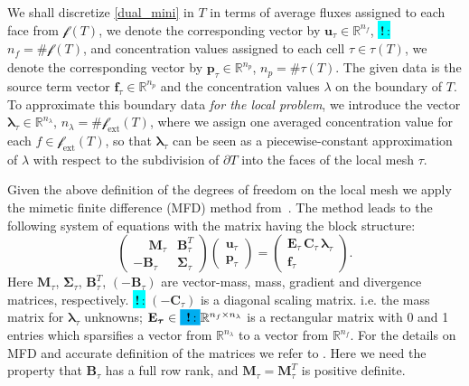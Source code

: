 \documentclass[12pt]{article}
\newcommand{\vect}[1]{\boldsymbol{\mathbf{#1}}}
\newcommand{\bmesh}{{\vect{\mathcal T}}}
\newcommand{\mmesh}{{\vect{\mathcal \tau}}}
\newcommand{\mfaces}[1][]{{\vect{\mathcal f}_{\text{#1}}}}
\newcommand{\toDiscuss}[1]{\colorbox{Cyan}{\textbf{\,!\,}:} #1}
\begin{document}
We shall discretize \eqref{dual_mini} in $T$ in terms of average fluxes assigned to each face from $\mfaces(T)$,
we denote the corresponding vector by ${\vect u}_\mmesh\in\mathbb{R}^{n_f}$, \toDiscuss{$n_f=\#\mfaces(T)$},  and concentration values assigned to each cell ${\tau \in \mmesh(T)}$, we denote the corresponding vector by ${\vect p}_\mmesh\in\mathbb{R}^{n_p}$, $n_p=\#\mmesh(T)$. The given data is the source term vector ${\vect f}_\mmesh\in \mathbb{R}^{n_p}$ and the concentration values $\lambda$ on the boundary of $T$.
To approximate this boundary data \emph{for the local problem}, we introduce the vector
${\vect \lambda}_\mmesh\in\mathbb{R}^{n_\lambda}$, $n_\lambda=\#\mfaces[ext](T)$,
where we assign one averaged concentration value for each $f\in\mfaces[ext](T)$, so that ${\vect \lambda}_\mmesh$ can be seen as a piecewise-constant approximation of $\lambda$ with respect to the subdivision of $\partial T$ into the faces of the local mesh $\mmesh$.

	
Given the above definition of the degrees of freedom on the local mesh we apply the mimetic finite difference (MFD) method from~\cite{lipnikov2014mimetic}. The method leads to the following system of equations with the matrix having the block structure:
	\begin{equation}\label{local}
		\begin{pmatrix}
			\phantom{-}\vect M_\mmesh & \vect B^T_\mmesh \\
			-\vect B_\mmesh & \vect \Sigma_\mmesh
		\end{pmatrix}
		\begin{pmatrix}
			{\vect u}_\mmesh \\
			{\vect p}_\mmesh
		\end{pmatrix}
		=
		\begin{pmatrix}
			\vect E_\mmesh\,\vect C_\mmesh\,{\vect \lambda}_\mmesh \\
			{\vect f}_\mmesh
		\end{pmatrix}.
	\end{equation}
Here $\vect M_\mmesh$, $\vect\Sigma_\mmesh$, $\vect B^T_\mmesh$, $(-\vect B_\mmesh)$ are vector-mass, mass, gradient and divergence matrices, respectively.
\toDiscuss{$(-\vect C_\mmesh)$} is a diagonal scaling matrix. i.e. the mass matrix for ${\vect \lambda}_\mmesh$ unknowns;
$\vect E_\mmesh \in \toDiscuss{\mathbb{R}^{n_f \times n_\lambda}}$ is a rectangular matrix with 0 and 1 entries which sparsifies a vector from  $\mathbb{R}^{n_{\lambda}}$
to a vector from  $\mathbb{R}^{n_{f}}$.
For the details on MFD and accurate definition of the matrices we refer to \cite{lipnikov2014mimetic,MFDbook}.
Here we need the property that  $\vect B_\mmesh$ has a full row rank, and $\vect M_\mmesh = \vect M^T_\mmesh$ is positive definite.
\end{document}
